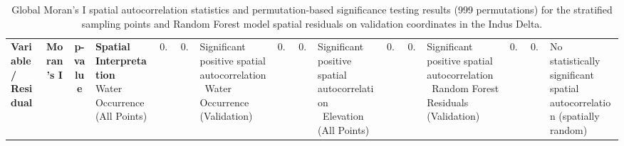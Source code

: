 \begin{table}[t]
\caption{Global Moran's I spatial autocorrelation statistics and permutation-based significance testing results (999 permutations) for the stratified sampling points and Random Forest model spatial residuals on validation coordinates in the Indus Delta.}
\label{tab:spatial_autocorrelation}
\centering
\small
\begin{tabular}{p{4.2cm} c c p{6.5cm}}
\hline
\textbf{Variable / Residual} & \textbf{Moran's I} & \textbf{p-value} & \textbf{Spatial Interpretation} \
\hline
Water Occurrence (All Points) & $0.209442$ & $0.0010$ & Significant positive spatial autocorrelation \
Water Occurrence (Validation) & $0.209384$ & $0.0010$ & Significant positive spatial autocorrelation \
Elevation (All Points) & $0.180902$ & $0.0010$ & Significant positive spatial autocorrelation \
Random Forest Residuals (Validation) & $0.002022$ & $0.8930$ & No statistically significant spatial autocorrelation (spatially random) \
\hline
\end{tabular}
\end{table}